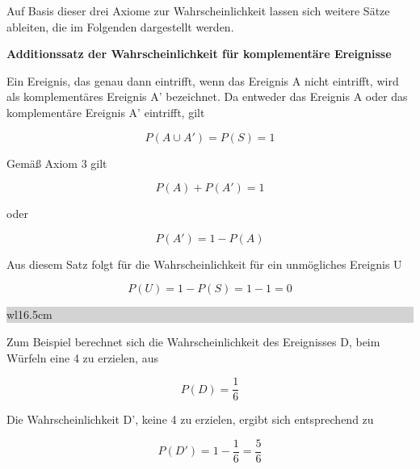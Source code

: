 \noindent Auf Basis dieser drei Axiome zur Wahrscheinlichkeit lassen sich weitere S\"{a}tze ableiten, die im Folgenden dargestellt werden.\bigskip

{\selectfont
\noindent\textbf{Additionssatz der Wahrscheinlichkeit f\"{u}r komplement\"{a}re Ereignisse}} \smallskip

\noindent Ein Ereignis, das genau dann eintrifft, wenn das Ereignis A nicht eintrifft, wird als komplement\"{a}res Ereignis A' bezeichnet. Da entweder das Ereignis A oder das komplement\"{a}re Ereignis A' eintrifft, gilt

\begin{equation}\label{eq:twofourtytwo}
P(A\cup A')=P(S)=1
\end{equation}

\noindent Gem\"{a}{\ss} Axiom 3 gilt

\begin{equation}\label{eq:twofourtythree}
P(A)+P(A')=1
\end{equation}

\noindent oder

\begin{equation}\label{eq:twofourtyfour}
P(A')=1-P(A)
\end{equation}

\noindent Aus diesem Satz folgt f\"{u}r die Wahrscheinlichkeit f\"{u}r ein unm\"{o}gliches Ereignis U 

\begin{equation}\label{eq:twofourtyfive}
P(U)=1-P(S)=1-1=0
\end{equation}

\noindent
\colorbox{lightgray}{%
%
\renewcommand\arraystretch{0.6}%
\begin{tabular}{ wl{16.5cm} }
{\selectfont
{}}
\end{tabular}%
}\bigskip

\noindent Zum Beispiel berechnet sich die Wahrscheinlichkeit des Ereignisses D, beim W\"{u}rfeln eine 4 zu erzielen, aus

\begin{equation}\label{eq:twofourtysix}
P\left(D\right)=\dfrac{1}{6}
\end{equation}

\noindent Die Wahrscheinlichkeit D', keine 4 zu erzielen, ergibt sich entsprechend zu 

\begin{equation}\label{eq:twofourtyseven}
P\left(D'\right)=1-\dfrac{1}{6} =\dfrac{5}{6}
\end{equation}

